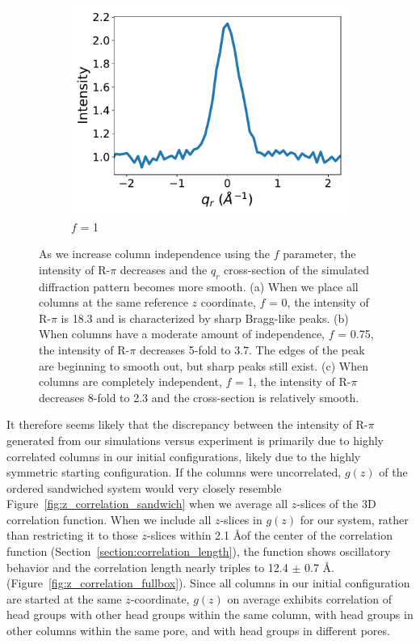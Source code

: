 \documentclass[journal=jpcbfk,manuscript=article]{achemso}
\begin{document}
\begin{figure}
  \begin{subfigure}{0.3\textwidth}
  \includegraphics[width=\textwidth]{sf_qy_sr100.pdf}
  \caption{$f$ = 1}\label{fig:sf_qy_sr100}
  \end{subfigure}
  \caption{As we increase column independence using the $f$ parameter, the
	  intensity of R-$\pi$ decreases and the $q_r$ cross-section of the simulated
	  diffraction pattern becomes more smooth.  (a) When we place all columns at the
	  same reference $z$ coordinate, $f$ = 0, the intensity of R-$\pi$ is 18.3 and is
	  characterized by sharp Bragg-like peaks. (b) When columns have a moderate
	  amount of independence, $f$ = 0.75, the intensity of R-$\pi$ decreases 5-fold
	  to 3.7. The edges of the peak are beginning to smooth out, but sharp peaks
	  still exist. (c) When columns are completely independent, $f$ = 1, the
	  intensity of R-$\pi$ decreases 8-fold to 2.3 and the cross-section is
          relatively smooth.}\label{fig:column_displacement}
  \end{figure}

  It therefore seems likely that the discrepancy between the intensity of
  R-$\pi$ generated from our simulations versus experiment is primarily due to
  highly correlated columns in our initial configurations, likely due to the
  highly symmetric starting configuration. If the columns were uncorrelated,
  $g(z)$ of the ordered sandwiched system would very closely resemble
  Figure~\ref{fig:z_correlation_sandwich} when we average all $z$-slices of the
  3D correlation function. When we include all $z$-slices in $g(z)$ for our
  system, rather than restricting it to those $z$-slices within 2.1 \AA of the
  center of the correlation function (Section~\ref{section:correlation_length}),
  the function shows oscillatory behavior and the correlation length
  nearly triples to 12.4 $\pm$ 0.7 \AA. (Figure~\ref{fig:z_correlation_fullbox}).
  Since all columns in our initial configuration are started at the same
  $z$-coordinate, $g(z)$ on average exhibits correlation of head groups with
  other head groups within the same column, with head groups in other columns
  within the same pore, and with head groups in different pores.
\end{document}
